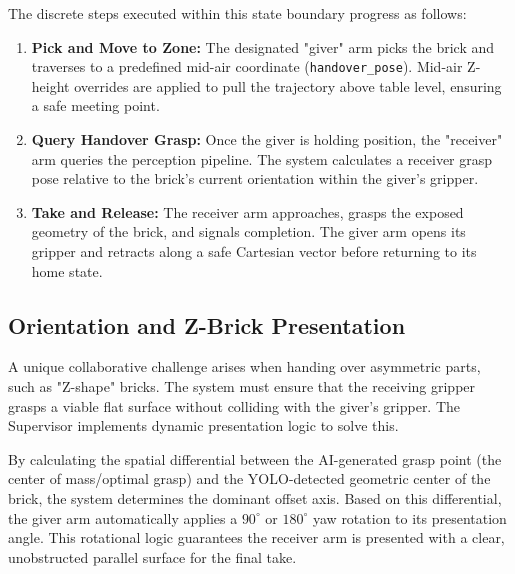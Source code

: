 The discrete steps executed within this state boundary progress as follows:
\begin{enumerate}
    \item \textbf{Pick and Move to Zone:} The designated "giver" arm picks the brick and traverses to a predefined mid-air coordinate (\texttt{handover\_pose}). Mid-air Z-height overrides are applied to pull the trajectory above table level, ensuring a safe meeting point.
    \item \textbf{Query Handover Grasp:} Once the giver is holding position, the "receiver" arm queries the perception pipeline. The system calculates a receiver grasp pose relative to the brick's current orientation within the giver's gripper.
    \item \textbf{Take and Release:} The receiver arm approaches, grasps the exposed geometry of the brick, and signals completion. The giver arm opens its gripper and retracts along a safe Cartesian vector before returning to its home state.
\end{enumerate}

\subsection{Orientation and Z-Brick Presentation}
A unique collaborative challenge arises when handing over asymmetric parts, such as "Z-shape" bricks. The system must ensure that the receiving gripper grasps a viable flat surface without colliding with the giver's gripper. The Supervisor implements dynamic presentation logic to solve this. 

By calculating the spatial differential between the AI-generated grasp point (the center of mass/optimal grasp) and the YOLO-detected geometric center of the brick, the system determines the dominant offset axis. Based on this differential, the giver arm automatically applies a $90^\circ$ or $180^\circ$ yaw rotation to its presentation angle. This rotational logic guarantees the receiver arm is presented with a clear, unobstructed parallel surface for the final take.